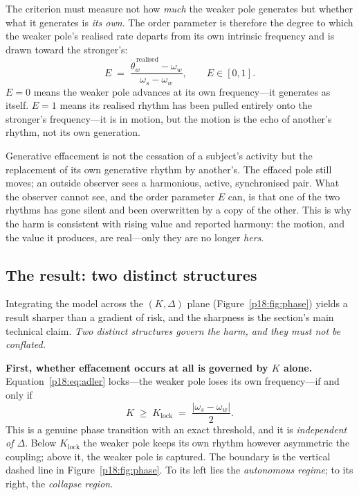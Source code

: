 The criterion must measure not how \emph{much} the weaker pole generates but whether what it generates is \emph{its own}. The order parameter is therefore the degree to which the weaker pole's realised rate departs from its own intrinsic frequency and is drawn toward the stronger's:
\begin{equation}
  E \;=\; \frac{\dot\theta_w^{\,\text{realised}} - \omega_w}{\omega_s - \omega_w},
  \qquad E\in[0,1].
  \label{p18:eq:order}
\end{equation}
$E=0$ means the weaker pole advances at its own frequency---it generates as itself. $E=1$ means its realised rhythm has been pulled entirely onto the stronger's frequency---it is in motion, but the motion is the echo of another's rhythm, not its own generation.

\begin{claim}
Generative effacement is not the cessation of a subject's activity but the replacement of its own generative rhythm by another's. The effaced pole still moves; an outside observer sees a harmonious, active, synchronised pair. What the observer cannot see, and the order parameter $E$ can, is that one of the two rhythms has gone silent and been overwritten by a copy of the other. This is why the harm is consistent with rising value and reported harmony: the motion, and the value it produces, are real---only they are no longer \emph{hers}.
\end{claim}

\subsection{The result: two distinct structures}
\label{p18:sub:crit-result}

Integrating the model across the $(K,\Delta)$ plane (Figure~\ref{p18:fig:phase}) yields a result sharper than a gradient of risk, and the sharpness is the section's main technical claim. \emph{Two distinct structures govern the harm, and they must not be conflated.}

\textbf{First, whether effacement occurs at all is governed by $K$ alone.} Equation~\eqref{p18:eq:adler} locks---the weaker pole loses its own frequency---if and only if
\begin{equation}
  K \;\ge\; K_{\text{lock}} \;=\; \frac{|\omega_s-\omega_w|}{2}.
  \label{p18:eq:klock}
\end{equation}
This is a genuine phase transition with an exact threshold, and it is \emph{independent of $\Delta$}. Below $K_{\text{lock}}$ the weaker pole keeps its own rhythm however asymmetric the coupling; above it, the weaker pole is captured. The boundary is the vertical dashed line in Figure~\ref{p18:fig:phase}. To its left lies the \emph{autonomous regime}; to its right, the \emph{collapse region}.

